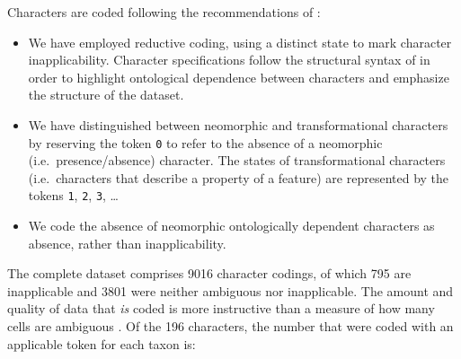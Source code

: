 \documentclass[openany]{book}
\theoremstyle{definition}
\theoremstyle{definition}
\theoremstyle{definition}
\theoremstyle{remark}
\begin{document}
Characters are coded following the recommendations of
\citet{Brazeau2018}:

\begin{itemize}
\item
  We have employed reductive coding, using a distinct state to mark
  character inapplicability. Character specifications follow the
  structural syntax of \citet{Sereno2007} in order to highlight
  ontological dependence between characters and emphasize the structure
  of the dataset.
\item
  We have distinguished between neomorphic and transformational
  characters \citep[sensu][]{Sereno2007} by reserving the token
  \texttt{0} to refer to the absence of a neomorphic
  (i.e.~presence/absence) character. The states of transformational
  characters (i.e.~characters that describe a property of a feature) are
  represented by the tokens \texttt{1}, \texttt{2}, \texttt{3}, \ldots{}
\item
  We code the absence of neomorphic ontologically dependent characters
  \citep[sensu][]{Vogt2017} as absence, rather than inapplicability.
\end{itemize}

The complete dataset comprises 9016 character codings, of which 795 are
inapplicable and 3801 were neither ambiguous nor inapplicable. The
amount and quality of data that \emph{is} coded is more instructive than
a measure of how many cells are ambiguous \citep{Wiens1998, Wiens2003}.
Of the 196 characters, the number that were coded with an applicable
token for each taxon is:
\end{document}

